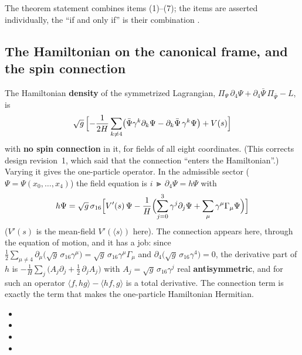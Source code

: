 The theorem statement combines items (1)--(7); the items are asserted individually, the ``if and
only if'' is their combination .

\subsection{The Hamiltonian on the canonical frame, and the spin connection}
\label{sec:6.11}

The Hamiltonian \textbf{density} of the symmetrized Lagrangian,
$\Pi_\Psi\,\partial_4\Psi+\partial_4\bar\Psi\,\Pi_{\bar\Psi}-L$, is
\[
  \sqrt g\,\Bigl[-\frac{1}{2H}\sum_{k\neq4}\bigl(\bar\Psi\gamma^k\partial_k\Psi-\partial_k\bar\Psi\,\gamma^k\Psi\bigr)+V(s)\Bigr]
\]
with \textbf{no spin connection} in it, for fields of all eight coordinates. (This corrects design
revision~1, which said that the connection ``enters the Hamiltonian''.) Varying it gives the
one-particle operator. In the admissible sector ($\Psi=\Psi(x_0,\dots,x_4)$) the field equation is
$i\,\Gt\,\partial_4\Psi=h\Psi$ with
\[
  h\Psi=\sqrt g\,\sigma_{16}\Bigl[V'(s)\,\Psi-\frac1H\Bigl(\sum_{j=0}^{3}\gamma^j\partial_j\Psi+\sum_\mu\gamma^\mu\Gamma_\mu\Psi\Bigr)\Bigr]
\]
($V'(s)$ is the mean-field $V'(\langle s\rangle)$ here). The connection appears here, through the
equation of motion, and it has a job: since
$\tfrac12\sum_{\mu\neq4}\partial_\mu\bigl(\sqrt g\,\sigma_{16}\gamma^\mu\bigr)=\sqrt g\,\sigma_{16}\gamma^\mu\Gamma_\mu$
and $\partial_4\bigl(\sqrt g\,\sigma_{16}\gamma^4\bigr)=0$, the derivative part of $h$ is
$-\frac1H\sum_j\bigl(A_j\partial_j+\tfrac12\,\partial_jA_j\bigr)$ with $A_j=\sqrt g\,\sigma_{16}\gamma^j$
real \textbf{antisymmetric}, and for such an operator $\langle f,hg\rangle-\langle hf,g\rangle$ is a
total derivative. The connection term is exactly the term that makes the one-particle Hamiltonian
Hermitian. 
\begin{itemize}
  \item {}
  \item {}
  \item {}
  \item {}
\end{itemize}

